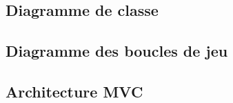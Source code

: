 \subsection{Diagramme de classe}


\subsection{Diagramme des boucles de jeu}


\subsection{Architecture MVC}


